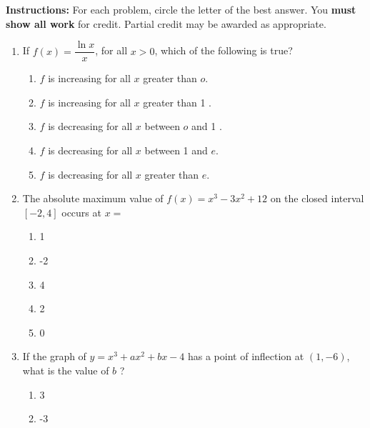 \documentclass{article}
\begin{document}
\pagestyle{fancy}
\fancyhf{}
\renewcommand{\footrulewidth}{0.4pt}

\noindent
\textbf{Instructions:} For each problem, circle the letter of the best answer.
You \textbf{must show all work} for credit. Partial credit may be awarded as appropriate.

\begin{enumerate}
	\itemsep2em
	\item
	\begin{minipage}[t]{\linewidth}
		If \({f}({x})=\dfrac{\ln x}{{x}}\), for all \({x}>0\), which of the
following is true?
\vspace{1em}
		\begin{enumerate}
		\itemsep1em
			\item \({f}\) is increasing for all \({x}\) greater than \({o}\).
			\item \({f}\) is increasing for all \({x}\) greater than 1 .
			\item \(f\) is decreasing for all \(x\) between \(o\) and 1 .
			\item \(f\) is decreasing for all \(x\) between 1 and \(e\).
			\item \(f\) is decreasing for all \(x\) greater than \(e\).
		\end{enumerate}
	\end{minipage}
	\item
	\begin{minipage}[t]{\linewidth}
		The absolute maximum value of \(f(x)=x^{3}-3 x^{2}+12\) on the closed
interval \([-2,4]\) occurs at \(x=\)
\vspace{1em}
		\begin{enumerate}
		\itemsep1em
			\item 1
			\item -2
			\item 4
			\item 2
			\item 0
		\end{enumerate}
	\end{minipage}
	\item
	\begin{minipage}[t]{\linewidth}
		If the graph of \(y=x^{3}+a x^{2}+b x-4\) has a point of inflection at
\((1,-6)\), what is the value of \(b\) ?
\vspace{1em}
		\begin{enumerate}
		\itemsep1em
			\item 3
			\item -3

\end{enumerate}
\end{minipage}
\end{enumerate}
\end{document}
